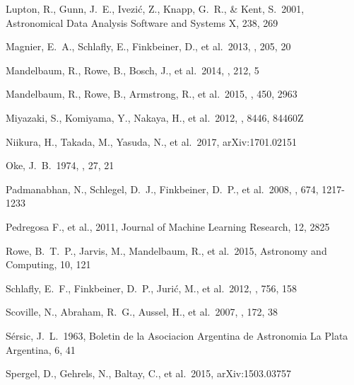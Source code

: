 \documentclass[useamsfonts]{pasj01}
\begin{document}
\begin{thebibliography}{}
     Lupton, R., Gunn, J.~E., Ivezi{\'c},
             Z., Knapp, G.~R., \& Kent, S.\ 2001, Astronomical Data Analysis Software
             and Systems X, 238, 269

     Magnier, E.~A., Schlafly, E.,
             Finkbeiner, D., et al.\ 2013, \apjs, 205, 20

     Mandelbaum, R., Rowe, B.,
            Bosch, J., et al.\ 2014, \apjs, 212, 5

     Mandelbaum, R., Rowe, B.,
             Armstrong, R., et al.\ 2015, \mnras, 450, 2963

     Miyazaki, S., Komiyama, Y., Nakaya,
             H., et al.\ 2012, \procspie, 8446, 84460Z

     Niikura, H., Takada, M., Yasuda, N.,
             et al.\ 2017, arXiv:1701.02151
    
     Oke, J.~B.\ 1974, \apjs, 27, 21 
    
     Padmanabhan, N., Schlegel,
             D.~J., Finkbeiner, D.~P., et al.\ 2008, \apj, 674, 1217-1233

     Pedregosa F., et al., 2011,
             Journal of Machine Learning Research, 12, 2825

     Rowe, B.~T.~P., Jarvis, M., Mandelbaum, R.,
             et al.\ 2015, Astronomy and Computing, 10, 121

     Schlafly, E.~F., Finkbeiner, D.~P.,
             Juri{\'c}, M., et al.\ 2012, \apj, 756, 158

     Scoville, N., Abraham, R.~G.,
             Aussel, H., et al.\ 2007, \apjs, 172, 38

     S{\'e}rsic, J.~L.\ 1963, Boletin de la
             Asociacion Argentina de Astronomia La Plata Argentina, 6, 41
   
     Spergel, D., Gehrels, N., Baltay, 
             C., et al.\ 2015, arXiv:1503.03757 


\end{thebibliography}
\end{document}
